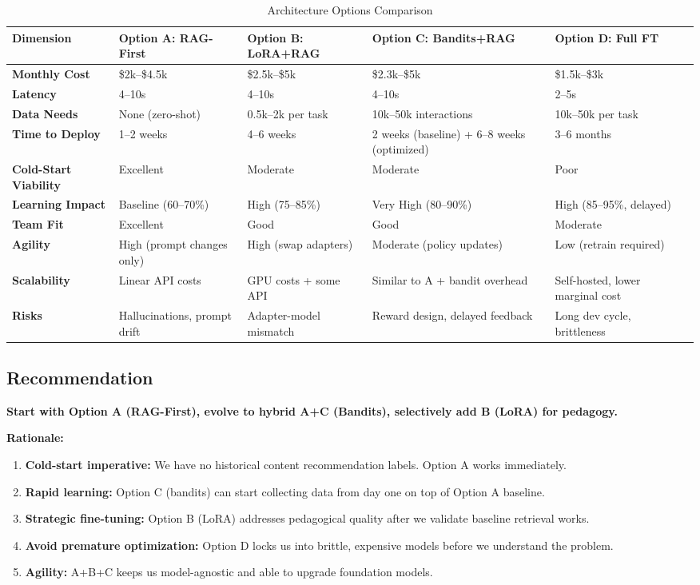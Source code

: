 \documentclass[11pt,letterpaper]{article}
\begin{document}
\begin{table}[H]
\centering
\small
\begin{tabular}{@{}p{2.5cm}p{2.3cm}p{2.3cm}p{2.3cm}p{2.3cm}p{2.3cm}@{}}
\toprule
\textbf{Dimension} & \textbf{Option A: RAG-First} & \textbf{Option B: LoRA+RAG} & \textbf{Option C: Bandits+RAG} & \textbf{Option D: Full FT} \\
\midrule
\textbf{Monthly Cost} & \$2k--\$4.5k & \$2.5k--\$5k & \$2.3k--\$5k & \$1.5k--\$3k \\
\textbf{Latency} & 4--10s & 4--10s & 4--10s & 2--5s \\
\textbf{Data Needs} & None (zero-shot) & 0.5k--2k per task & 10k--50k interactions & 10k--50k per task \\
\textbf{Time to Deploy} & 1--2 weeks & 4--6 weeks & 2 weeks (baseline) + 6--8 weeks (optimized) & 3--6 months \\
\textbf{Cold-Start Viability} & Excellent & Moderate & Moderate & Poor \\
\textbf{Learning Impact} & Baseline (60--70\%) & High (75--85\%) & Very High (80--90\%) & High (85--95\%, delayed) \\
\textbf{Team Fit} & Excellent & Good & Good & Moderate \\
\textbf{Agility} & High (prompt changes only) & High (swap adapters) & Moderate (policy updates) & Low (retrain required) \\
\textbf{Scalability} & Linear API costs & GPU costs + some API & Similar to A + bandit overhead & Self-hosted, lower marginal cost \\
\textbf{Risks} & Hallucinations, prompt drift & Adapter-model mismatch & Reward design, delayed feedback & Long dev cycle, brittleness \\
\bottomrule
\end{tabular}
\caption{Architecture Options Comparison}
\label{tab:arch-compare}
\end{table}

\subsection{Recommendation}

\textbf{Start with Option A (RAG-First), evolve to hybrid A+C (Bandits), selectively add B (LoRA) for pedagogy.}

\textbf{Rationale:}
\begin{enumerate}
\item \textbf{Cold-start imperative:} We have no historical content recommendation labels. Option A works immediately.
\item \textbf{Rapid learning:} Option C (bandits) can start collecting data from day one on top of Option A baseline.
\item \textbf{Strategic fine-tuning:} Option B (LoRA) addresses pedagogical quality after we validate baseline retrieval works.
\item \textbf{Avoid premature optimization:} Option D locks us into brittle, expensive models before we understand the problem.
\item \textbf{Agility:} A+B+C keeps us model-agnostic and able to upgrade foundation models.
\end{enumerate}
\end{document}
